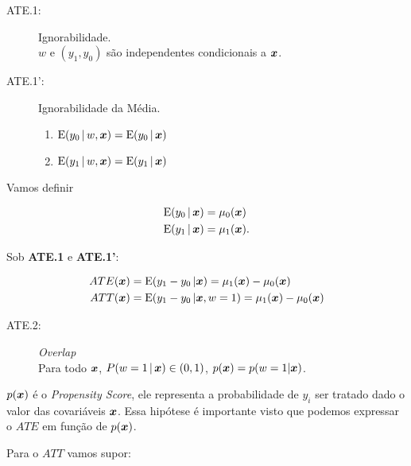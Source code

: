 \documentclass[11pt, oneside, a4paper, article]{article}
\numberwithin{equation}{section}
\begin{document}
\begin{description}
	\begin{description}
		\item[ATE.1:] Ignorabilidade. 
			\\
			$w$ e $(y_{1}, y_{0})$ são independentes condicionais a $\boldsymbol{x}$.

		\item[ATE.1':] Ignorabilidade da Média. 

			\vspace{-.75 em}
			\begin{enumerate}[label =\alph*)] \itemsep0pt
			\item $\text{E}( y_{0} \, | \, w, \boldsymbol{x} ) = \text{E}( y_{0} \, | \, \boldsymbol{x} )$
			\item $\text{E}( y_{1} \, | \, w, \boldsymbol{x} ) = \text{E}( y_{1} \, | \, \boldsymbol{x} )$
		\end{enumerate}

\end{description}

Vamos definir

\vspace{-1 em}
\begin{align*}
	\text{E}( y_{0} \, | \, \boldsymbol{x} ) &= \mu_{0}( \boldsymbol{x} )
	\\
	\text{E}( y_{1} \, | \, \boldsymbol{x} ) &= \mu_{1}( \boldsymbol{x} ).
\end{align*}

Sob \textbf{ATE.1} e \textbf{ATE.1'}:

\vspace{-1 em}
\begin{align*}
	ATE( \boldsymbol{x} ) &= \text{E}( y_{1} - y_{0} \, | \boldsymbol{x} ) = \mu_{1}(\boldsymbol{x}) - \mu_{0}(\boldsymbol{x}) 
	\\
	ATT( \boldsymbol{x} ) &= \text{E}( y_{1} - y_{0} \, | \boldsymbol{x}, w=1 ) = \mu_{1}(\boldsymbol{x}) - \mu_{0}(\boldsymbol{x}) 
\end{align*}

\begin{description}
	\item[ATE.2:] \textit{Overlap} \\
		Para todo $\boldsymbol{x}$, $P(w=1 \, | \, \boldsymbol{x} ) \in ( 0, 1 )$, 
		$p(\boldsymbol{x}) = p(w=1 | \boldsymbol{x})$.
\end{description}

$p(\boldsymbol{x})$ é o \textit{Propensity Score}, ele representa a probabilidade de $y_{i}$ ser tratado dado o valor das covariáveis $\boldsymbol{x}$.
Essa hipótese é importante visto que podemos expressar o $ATE$ em função de $p(\boldsymbol{x})$.

\vspace{1 em}
Para o $ATT$ vamos supor:


\end{description}
\end{document}
